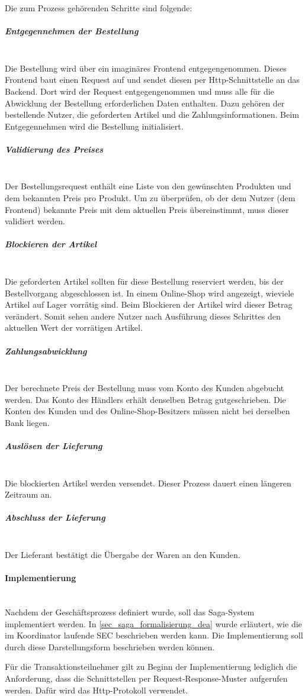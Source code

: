 Die zum Prozess gehörenden Schritte sind folgende:

\subparagraph*{Entgegennehmen der Bestellung} \mbox{}\\
Die Bestellung wird über ein imaginäres Frontend entgegengenommen. Dieses Frontend baut einen Request auf und sendet diesen per Http-Schnittstelle an das Backend. Dort wird der Request entgegengenommen und muss alle für die Abwicklung der Bestellung erforderlichen Daten enthalten. Dazu gehören der bestellende Nutzer, die geforderten Artikel und die Zahlungsinformationen. Beim Entgegennehmen wird die Bestellung initialisiert.

\subparagraph*{Validierung des Preises} \mbox{}\\
Der Bestellungsrequest enthält eine Liste von den gewünschten Produkten und dem bekannten Preis pro Produkt. Um zu überprüfen, ob der dem Nutzer (dem Frontend) bekannte Preis mit dem aktuellen Preis übereinstimmt, muss dieser validiert werden. %

\subparagraph*{Blockieren der Artikel} \mbox{}\\
Die geforderten Artikel sollten für diese Bestellung reserviert werden, bis der Bestellvorgang abgeschlossen ist. In einem Online-Shop wird angezeigt, wieviele Artikel auf Lager vorrätig sind. Beim Blockieren der Artikel wird dieser Betrag verändert. Somit sehen andere Nutzer nach Ausführung dieses Schrittes den aktuellen Wert der vorrätigen Artikel. 

\subparagraph*{Zahlungsabwicklung} \mbox{}\\
Der berechnete Preis der Bestellung muss vom Konto des Kunden abgebucht werden. Das Konto des Händlers erhält denselben Betrag gutgeschrieben. Die Konten des Kunden und des Online-Shop-Besitzers müssen nicht bei derselben Bank liegen. 

\subparagraph*{Auslösen der Lieferung} \mbox{}\\
Die blockierten Artikel werden versendet. Dieser Prozess dauert einen längeren Zeitraum an.

\subparagraph*{Abschluss der Lieferung} \mbox{}\\
Der Lieferant bestätigt die Übergabe der Waren an den Kunden.


\paragraph*{Implementierung} \mbox{}\\

Nachdem der Geschäftsprozess definiert wurde, soll das Saga-System implementiert werden. In \ref{sec_saga_formalisierung_dea} wurde erläutert, wie die im Koordinator laufende SEC beschrieben werden kann. Die Implementierung soll durch diese Darstellungsform beschrieben werden können.

Für die Transaktionsteilnehmer gilt zu Beginn der Implementierung lediglich die Anforderung, dass die Schnittstellen per Request-Response-Muster aufgerufen werden. Dafür wird das Http-Protokoll verwendet.

